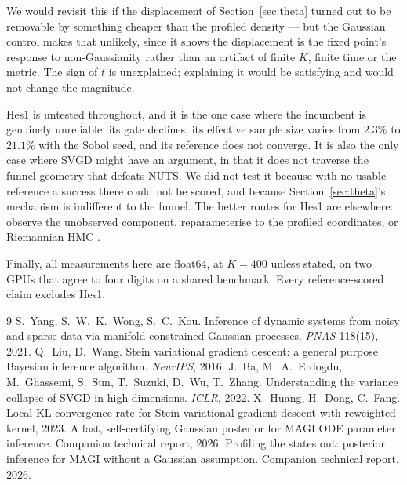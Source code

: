 \documentclass[11pt]{article}
\theoremstyle{remark}
\begin{document}
We would revisit this if the displacement of Section~\ref{sec:theta} turned out to be removable by
something cheaper than the profiled density --- but the Gaussian control makes that unlikely, since
it shows the displacement is the fixed point's response to non-Gaussianity rather than an artifact
of finite $K$, finite time or the metric. The sign of $t$ is unexplained; explaining it would be
satisfying and would not change the magnitude.

Hes1 is untested throughout, and it is the one case where the incumbent is genuinely unreliable:
its gate declines, its effective sample size varies from $2.3\%$ to $21.1\%$ with the Sobol seed,
and its reference does not converge. It is also the only case where SVGD might have an argument, in
that it does not traverse the funnel geometry that defeats NUTS. We did not test it because with no
usable reference a success there could not be scored, and because Section~\ref{sec:theta}'s
mechanism is indifferent to the funnel. The better routes for Hes1 are elsewhere:
observe the unobserved component, reparameterise to the profiled coordinates, or Riemannian HMC
\cite{companion2}.

Finally, all measurements here are float64, at $K = 400$ unless stated, on two GPUs that agree to
four digits on a shared benchmark. Every reference-scored claim excludes Hes1.

\begin{thebibliography}{9}
\small
{} S.~Yang, S.~W.~K.~Wong, S.~C.~Kou.
  Inference of dynamic systems from noisy and sparse data via manifold-constrained Gaussian
  processes. \emph{PNAS} 118(15), 2021.
 Q.~Liu, D.~Wang.
  Stein variational gradient descent: a general purpose Bayesian inference algorithm.
  \emph{NeurIPS}, 2016.
 J.~Ba, M.~A.~Erdogdu, M.~Ghassemi, S.~Sun, T.~Suzuki, D.~Wu, T.~Zhang.
  Understanding the variance collapse of SVGD in high dimensions. \emph{ICLR}, 2022.
 X.~Huang, H.~Dong, C.~Fang.
  Local KL convergence rate for Stein variational gradient descent with reweighted kernel, 2023.
 A fast, self-certifying Gaussian posterior for MAGI ODE parameter inference.
  Companion technical report, 2026.
 Profiling the states out: posterior inference for MAGI without a Gaussian
  assumption. Companion technical report, 2026.
\end{thebibliography}
\end{document}
